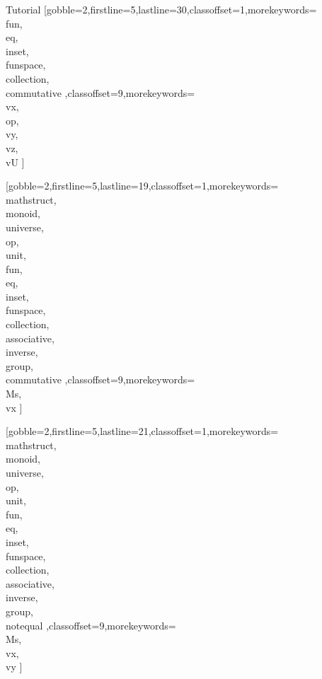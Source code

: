 \documentclass[lang={en,de}]{stex}
\begin{document}
\begin{sfragment}{Tutorial}
    [gobble=2,firstline=5,lastline=30,classoffset=1,morekeywords={
    \\fun,\\eq,\\inset,
    \\funspace,\\collection,\\commutative
    },classoffset=9,morekeywords={
      \\vx,\\op,\\vy,\\vz,\\vU
    }]

    [gobble=2,firstline=5,lastline=19,classoffset=1,morekeywords={
    \\mathstruct,\\monoid,\\universe,\\op,\\unit,\\fun,\\eq,\\inset,
    \\funspace,\\collection,\\associative,\\inverse,\\group,
    \\commutative
    },classoffset=9,morekeywords={
      \\Ms,\\vx
    }]

    [gobble=2,firstline=5,lastline=21,classoffset=1,morekeywords={
    \\mathstruct,\\monoid,\\universe,\\op,\\unit,\\fun,\\eq,\\inset,
    \\funspace,\\collection,\\associative,\\inverse,\\group,\\notequal
    },classoffset=9,morekeywords={
      \\Ms,\\vx,\\vy
    }]

  \end{sfragment}
  
\end{document}
